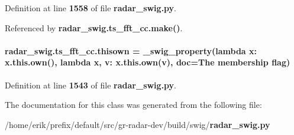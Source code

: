 Definition at line {\bf 1558} of file {\bf radar\+\_\+swig.\+py}.



Referenced by {\bf radar\+\_\+swig.\+ts\+\_\+fft\+\_\+cc.\+make()}.

\paragraph[{thisown}]{\setlength{\rightskip}{0pt plus 5cm}radar\+\_\+swig.\+ts\+\_\+fft\+\_\+cc.\+thisown = {\bf \+\_\+swig\+\_\+property}(lambda x\+: x.\+this.\+own(), lambda {\bf x}, v\+: x.\+this.\+own(v), doc=\textquotesingle{}The membership flag\textquotesingle{})\hspace{0.3cm}{\ttfamily [static]}}\label{classradar__swig_1_1ts__fft__cc_ae1f1fef0a5c540605433eaff6c7b2b60}


Definition at line {\bf 1543} of file {\bf radar\+\_\+swig.\+py}.



The documentation for this class was generated from the following file\+:\begin{DoxyCompactItemize}
\item 
/home/erik/prefix/default/src/gr-\/radar-\/dev/build/swig/{\bf radar\+\_\+swig.\+py}\end{DoxyCompactItemize}
